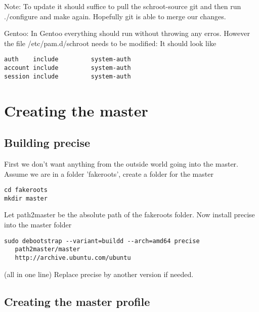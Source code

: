 \documentclass[a4paper]{book}
\begin{document}
Note: To update it should suffice to pull the schroot-source git and then run ./configure and make again. Hopefully git is able to merge our changes.

Gentoo: In Gentoo everything should run without throwing any erros. However the file /etc/pam.d/schroot needs to be modified: It should look like
\begin{verbatim}
auth    include         system-auth
account include         system-auth
session include         system-auth
\end{verbatim}

\section{Creating the master}
\subsection{Building precise}
First we don't want anything from the outside world going into the master.
Assume we are in a folder 'fakeroots', create a folder for the master

\begin{verbatim}
cd fakeroots
mkdir master
\end{verbatim}

Let path2master be the absolute path of the fakeroots folder.
Now install precise into the master folder

\begin{verbatim}
sudo debootstrap --variant=buildd --arch=amd64 precise 
   path2master/master 
   http://archive.ubuntu.com/ubuntu
\end{verbatim}

(all in one line)
Replace precise by another version if needed.


\subsection{Creating the master profile}
\end{document}
